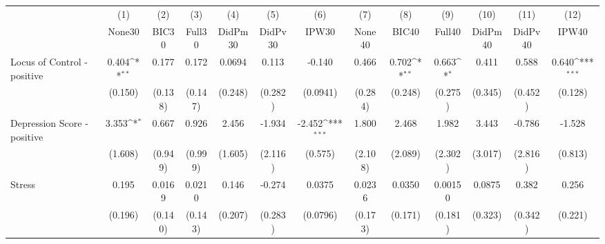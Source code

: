 {
\def\sym#1{\ifmmode^{#1}\else\(^{#1}\)\fi}
\begin{tabular}{l*{12}{c}}
\toprule
            &\multicolumn{1}{c}{(1)}&\multicolumn{1}{c}{(2)}&\multicolumn{1}{c}{(3)}&\multicolumn{1}{c}{(4)}&\multicolumn{1}{c}{(5)}&\multicolumn{1}{c}{(6)}&\multicolumn{1}{c}{(7)}&\multicolumn{1}{c}{(8)}&\multicolumn{1}{c}{(9)}&\multicolumn{1}{c}{(10)}&\multicolumn{1}{c}{(11)}&\multicolumn{1}{c}{(12)}\\
            &\multicolumn{1}{c}{None30}&\multicolumn{1}{c}{BIC30}&\multicolumn{1}{c}{Full30}&\multicolumn{1}{c}{DidPm30}&\multicolumn{1}{c}{DidPv30}&\multicolumn{1}{c}{IPW30}&\multicolumn{1}{c}{None40}&\multicolumn{1}{c}{BIC40}&\multicolumn{1}{c}{Full40}&\multicolumn{1}{c}{DidPm40}&\multicolumn{1}{c}{DidPv40}&\multicolumn{1}{c}{IPW40}\\
\midrule
Locus of Control - positive&       0.404\sym{**} &       0.177         &       0.172         &      0.0694         &       0.113         &      -0.140         &       0.466         &       0.702\sym{**} &       0.663\sym{*}  &       0.411         &       0.588         &       0.640\sym{***}\\
            &     (0.150)         &     (0.138)         &     (0.147)         &     (0.248)         &     (0.282)         &    (0.0941)         &     (0.284)         &     (0.248)         &     (0.275)         &     (0.345)         &     (0.452)         &     (0.128)         \\
\addlinespace
Depression Score - positive&       3.353\sym{*}  &       0.667         &       0.926         &       2.456         &      -1.934         &      -2.452\sym{***}&       1.800         &       2.468         &       1.982         &       3.443         &      -0.786         &      -1.528         \\
            &     (1.608)         &     (0.949)         &     (0.999)         &     (1.605)         &     (2.116)         &     (0.575)         &     (2.108)         &     (2.089)         &     (2.302)         &     (3.017)         &     (2.816)         &     (0.813)         \\
\addlinespace
Stress      &       0.195         &      0.0169         &      0.0210         &       0.146         &      -0.274         &      0.0375         &      0.0236         &      0.0350         &     0.00150         &      0.0875         &       0.382         &       0.256         \\
            &     (0.196)         &     (0.140)         &     (0.143)         &     (0.207)         &     (0.283)         &    (0.0796)         &     (0.173)         &     (0.171)         &     (0.181)         &     (0.323)         &     (0.342)         &     (0.221)         \\

\end{tabular}}
